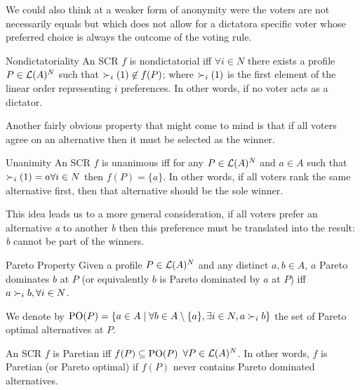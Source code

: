 	We could also think at a weaker form of anonymity were the voters are not necessarily equals but which does not allow for a dictator\textemdash a specific voter whose preferred choice is always the outcome of the voting rule. 

	\begin{genthm}{Nondictatoriality}
	An \acs{SCR} $f$ is nondictatorial iff $\forall i \in N$ there exists a profile $P \in\mathcal{L}(A)^{N}$ such that $\prefi(1) \not\in f(P)$; where $\prefi(1)$ is the first element of the linear order representing $i$ preferences. In other words, if no voter acts as a dictator.
	\end{genthm}


	Another fairly obvious property that might come to mind is that if all voters agree on an alternative then it must be selected as the winner.
	
	\begin{genthm}{Unanimity}
	An \acs{SCR} $f$ is unanimous iff for any $P\in\mathcal{L}(A)^{N}$ and $a \in A$ such that $\prefi(1)=a \forall i \in N$ then $f(P)=\{a\}$. In other words, if all voters rank the same alternative first, then that alternative should be the sole winner.	
	\end{genthm}

	This idea leads us to a more general consideration, if all voters prefer an alternative \textit{a} to another \textit{b} then this preference must be translated into the result: \textit{b} cannot be part of the winners.

	\begin{genthm}{Pareto Property}
	Given a profile $P\in\mathcal{L}(A)^{N}$ and any distinct $a,b\in A$, $a$ Pareto dominates $b$ at $P$ (or equivalently $b$ is Pareto dominated by $a$ at $P$) iff $a \prefi b,\forall i\in N$.
	
	We denote by $\paretopt(P)= \set{a \in A \suchthat \forall b \in A\setminus\{a\}, \exists i \in N, a \pref_i b}$ the set of Pareto optimal alternatives at $P$.
	
	An \acs{SCR} $f$ is Paretian iff $f(P)\subseteq\text{PO}(P)$ $\forall P\in\mathcal{L}(A)^{N}$. In other words, $f$ is Paretian (or Pareto optimal) if $f(P)$ never contains Pareto dominated alternatives.	
	\end{genthm}

